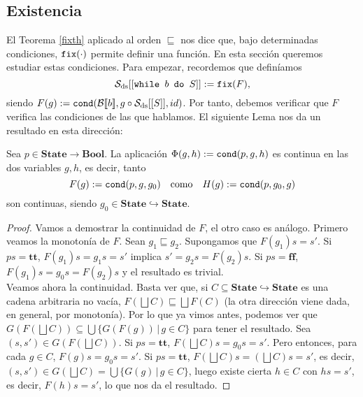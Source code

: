 \subsection{Existencia}

El Teorema \ref{fixth} aplicado al orden $\sqsubseteq$ nos dice que, bajo determinadas condiciones, $\texttt{fix}(\cdot)$ permite definir una función. En esta sección queremos estudiar estas condiciones. Para empezar, recordemos que definíamos 
$$\mathcal{S}_{\mathrm{ds}} [[\texttt{while } b \texttt{ do } S]] :=  \texttt{fix}(F),$$
siendo $F(g) := \texttt{cond}(\mathcal{B}[\![b]\!], g\circ \mathcal{S}_{\mathrm{ds}}[[S]], id)$. Por tanto, debemos verificar que $F$ verifica las condiciones de las que hablamos. El siguiente Lema nos da un resultado en esta dirección:

\begin{lema}\label{dslema1}
Sea $p \in \mathbf{State}\to\mathbf{Bool}$. La aplicación $\Phi(g, h) := \texttt{cond}(p, g, h)$ es continua en las dos variables $g, h$, es decir, tanto
$$F(g) := \texttt{cond}(p, g, g_0) \quad \text{como} \quad H(g) := \texttt{cond}(p, g_0, g)$$
son continuas, siendo $g_0 \in \mathbf{State}\hookrightarrow\mathbf{State}$.
\end{lema}
\begin{proof}
Vamos a demostrar la continuidad de $F$, el otro caso es análogo. Primero veamos la monotonía de $F$. Sean $g_1 \sqsubseteq g_2$. Supongamos que $F(g_1)s = s'$. Si $ps = \mathbf{tt}$, $F(g_1)s = g_1s = s'$ implica $s' = g_2s = F(g_2)s$. Si $ps = \mathbf{ff}$, $F(g_1)s = g_0s = F(g_2)s$ y el resultado es trivial.
\\

Veamos ahora la continuidad. Basta ver que, si $C \subseteq \mathbf{State}\hookrightarrow\mathbf{State}$ es una cadena arbitraria no vacía, $F(\bigsqcup C) \sqsubseteq \bigsqcup F(C)$ (la otra dirección viene dada, en general, por monotonía). Por lo que ya vimos antes, podemos ver que $G(F(\bigsqcup C)) \subseteq \bigcup \{G(F(g)) \, | \, g \in C\}$ para tener el resultado. Sea $(s, s')\in G(F(\bigsqcup C))$. Si $ps = \mathbf{tt}$, $F(\bigsqcup C)s = g_0s= s'$. Pero entonces, para cada $g \in C$, $F(g)s = g_0s = s'$. Si $ps = \mathbf{tt}$, $F(\bigsqcup C)s = (\bigsqcup C)s = s'$, es decir, $(s, s')\in G(\bigsqcup C) = \bigcup \{G(g) \, | \, g \in C\}$, luego existe cierta $h \in C$ con $hs = s'$, es decir, $F(h)s = s'$, lo que nos da el resultado.
\end{proof}

